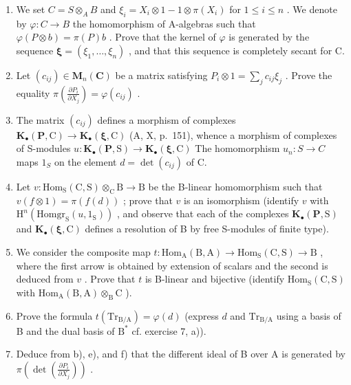 \begin{enumerate}
\def\labelenumi{\alph{enumi})}
\item
  We set \(C = S \otimes_{A} B\) and \(\xi_{i} = X_{i} \otimes 1 - 1 \otimes \pi(X_{i})\) for \(1 \leqslant i \leqslant n\) . We denote by \(\varphi : C \to B\) the homomorphism of A-algebras such that \(\varphi(P \otimes b) = \pi(P)b\) . Prove that the kernel of \(\varphi\) is generated by the sequence \(\boldsymbol{\xi} = (\xi_{1}, \ldots, \xi_{n})\) , and that this sequence is completely secant for C.
\item
  Let \((c_{ij}) \in \mathbf{M}_{n}(\mathbf{C})\) be a matrix satisfying \(P_{i} \otimes 1 = \sum_{j} c_{ij} \xi_{j}\) . Prove the equality \(\pi(\frac{\partial P_{i}}{\partial X_{j}}) = \varphi(c_{ij})\) .
\item
  The matrix \((c_{ij})\) defines a morphism of complexes \(\mathbf{K}_{\bullet}(\mathbf{P},\mathrm{C})\to\mathbf{K}_{\bullet}(\boldsymbol{\xi},\mathrm{C})\) (A, X, p.~151), whence a morphism of complexes of S-modules \(u:\mathbf{K}_{\bullet}(\mathbf{P},\mathrm{S})\to\mathbf{K}_{\bullet}(\boldsymbol{\xi},\mathrm{C})\) The homomorphism \(u_{n}:S\to C\) maps \(1_{S}\) on the element \(d=\det(c_{ij})\) of C.
\item
  Let \(v: \mathrm{Hom}_{\mathrm{S}}(\mathrm{C}, \mathrm{S}) \otimes_{\mathrm{C}} \mathrm{B} \to \mathrm{B}\) be the B-linear homomorphism such that \(v(f \otimes 1) = \pi(f(d))\) ; prove that \(v\) is an isomorphism (identify \(v\) with \(\mathrm{H}^n(\mathrm{Homgr}_{\mathrm{S}}(u, 1_{\mathrm{S}}))\) , and observe that each of the complexes \(\mathbf{K}_{\bullet}(\mathbf{P}, \mathrm{S})\) and \(\mathbf{K}_{\bullet}(\boldsymbol{\xi}, \mathrm{C})\) defines a resolution of B by free S-modules of finite type).

\item
  We consider the composite map \(t: \mathrm{Hom}_{\mathrm{A}}(\mathrm{B}, \mathrm{A}) \to \mathrm{Hom}_{\mathrm{S}}(\mathrm{C}, \mathrm{S}) \to \mathrm{B}\) , where the first arrow is obtained by extension of scalars and the second is deduced from \(v\) . Prove that \(t\) is B-linear and bijective (identify \(\mathrm{Hom}_{\mathrm{S}}(\mathrm{C}, \mathrm{S})\) with \(\mathrm{Hom}_{\mathrm{A}}(\mathrm{B}, \mathrm{A}) \otimes_{\mathrm{B}} \mathrm{C}\) ).
\item
  Prove the formula \(t(\mathrm{Tr}_{\mathrm{B / A}}) = \varphi (d)\) (express \(d\) and \(\mathrm{Tr}_{\mathrm{B / A}}\) using a basis of B and the dual basis of \(\mathrm{B}^*\) cf. exercise 7, a)).
\item
  Deduce from b), e), and f) that the different ideal of B over A is generated by \(\pi(\det(\frac{\partial P_i}{\partial X_j}))\) .
\end{enumerate}

